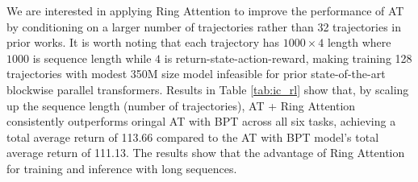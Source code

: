 \documentclass{article}
\newcommand{\ours}{{Ring Attention}\xspace}
\begin{document}
\begin{table}[!b]
\centering
\vspace{-1em}
\caption{Application of \ours on improving Transformer in RL. BC and DT use vanilla attention. AT + ME denotes using memory efficient attention, AT + BPT denotes using blockwise parallel transformer. AT + RA denotes using \ours.}
\label{tab:ic_rl}
\small
{}
\end{table}
We are interested in applying \ours to improve the performance of AT by conditioning on a larger number of trajectories rather than 32 trajectories in prior works.
It is worth noting that each trajectory has $1000 \times 4$ length where $1000$ is sequence length while $4$ is return-state-action-reward, making training 128 trajectories with modest 350M size model infeasible for prior state-of-the-art blockwise parallel transformers.
Results in Table \ref{tab:ic_rl} show that, by scaling up the sequence length (number of trajectories), AT + \ours consistently outperforms oringal AT with BPT across all six tasks, achieving a total average return of 113.66 compared to the AT with BPT model's total average return of 111.13.
The results show that the advantage of \ours for training and inference with long sequences.
\end{document}
